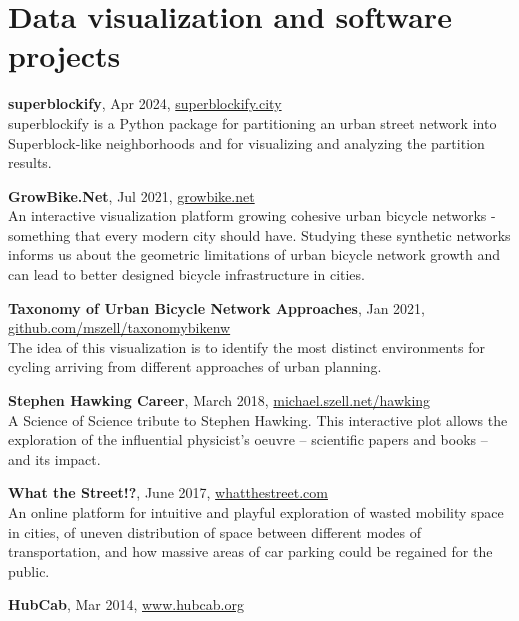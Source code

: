 \documentclass[10pt,a4paper]{article}
\renewenvironment{itemize}{
  \begin{list}{}{
    \setlength{\leftmargin}{1.5em}
    \setlength{\itemsep}{0.25em}
    \setlength{\parskip}{0pt}
    \setlength{\parsep}{0.25em}
  }
}{
  \end{list}
}
\begin{document}
\section*{Data visualization and software projects}
\begin{itemize}
\item{\textbf{superblockify}, Apr 2024, \href{https://superblockify.city}{superblockify.city}\\[2pt]
superblockify is a Python package for partitioning an urban street network into Superblock-like neighborhoods and for visualizing and analyzing the partition results.}\\
\item{\textbf{GrowBike.Net}, Jul 2021, \href{https://growbike.net}{growbike.net}\\[2pt]
An interactive visualization platform growing cohesive urban bicycle networks - something that every modern city should have. Studying these synthetic networks informs us about the geometric limitations of urban bicycle network growth and can lead to better designed bicycle infrastructure in cities.}\\
\item{\textbf{Taxonomy of Urban Bicycle Network Approaches}, Jan 2021, \href{https://github.com/mszell/taxonomybikenw}{github.com/mszell/taxonomybikenw}\\[2pt]
The idea of this visualization is to identify the most distinct environments for cycling arriving from different approaches of urban planning.}\\
\item{\textbf{Stephen Hawking Career}, March 2018, \href{http://michael.szell.net/hawking/}{michael.szell.net/hawking}\\[4pt]
A Science of Science tribute to Stephen Hawking. This interactive plot allows the exploration of the influential physicist's oeuvre -- scientific papers and books -- and its impact.}\\
\item{\textbf{What the Street!?}, June 2017, \href{https://whatthestreet.com}{whatthestreet.com}\\[2pt]
An online platform for intuitive and playful exploration of wasted mobility space in cities, of uneven distribution of space between different modes of transportation, and how massive areas of car parking could be regained for the public.}\\
\item{\textbf{HubCab}, Mar 2014, \href{http://www.hubcab.org/}{www.hubcab.org}\\[2pt]
}
\end{itemize}
\end{document}
